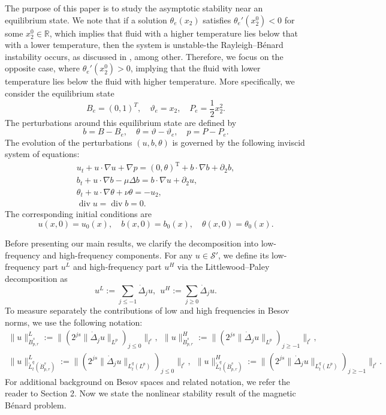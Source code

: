 \documentclass[reqno]{amsart}
\begin{document}
The purpose of this paper is to study the asymptotic stability near an equilibrium state.
We note that if a solution $\theta_e(x_2)$ satisfies $\theta_e'(x_2^0)<0$ for some
$x_2^0\in\mathbb{R}$, which implies that fluid with a higher temperature lies below that with a lower temperature, then the system is unstable-the Rayleigh--B\'enard instability occurs, as discussed
in \cite{MR128226,MR2098531,MR4134456}, among other. Therefore, we focus on the opposite case, where $\theta_e'(x_2^0)>0$, implying that the fluid with lower temperature lies below the fluid with
higher temperature. More specifically, we consider the equilibrium state
$$
{B}_e=(0,1)^T,\quad \vartheta_e=x_2,\quad
 P_e=\frac{1}{2}x_2^2.
 $$
 The perturbations around this equilibrium state are defined by
\begin{equation*}
 b=B-{B}_e,\quad \theta=\vartheta-\vartheta_e,\quad p=P-P_e.
\end{equation*}
The evolution of the perturbations $(u,b,\theta)$ is governed by the following inviscid system of
equations:
\begin{equation}\label{1.2}
\begin{gathered}
 u_t+ u\cdot \nabla u+\nabla p= (0,\theta)^\mathrm{T}+ b\cdot \nabla b+\partial_2b,\\
 b_t+u\cdot\nabla b-\mu\Delta b=b\cdot\nabla u+\partial_2u,\\
 \theta_t+u\cdot \nabla \theta+\nu\theta=-u_2,\\
 \operatorname{div} u=\operatorname{div} b=0.
\end{gathered}
\end{equation}
 The corresponding initial conditions are
 \begin{equation} \label{1.1.2}
 u(x,0)=u_0(x),\quad b(x,0)=b_0(x),\quad \theta(x,0)=\theta_0(x).
 \end{equation}

 Before presenting our main results, we clarify the decomposition into low-frequency and high-frequency
 components. For any $u\in\mathcal{S}'$, we define its low-frequency part $u^{L}$ and high-frequency
 part $u^{H}$ via the Littlewood--Paley decomposition as
\[
 u^L:=\sum_{j\leqslant-1}\dot{\Delta}_ju,\ \ u^H:=\sum_{j\geqslant 0}\dot{\Delta}_ju.
\]
To measure separately the contributions of low and high frequencies in Besov norms, we use the following notation:
\begin{gather*}
\|u\|_{\dot{B}^{s}_{p,r}}^L:=\|(2^{js}\|\dot{\Delta}_ju\|_{L^p})_{j\leqslant 0}\|_{l^r},\ \ \|u\|_{\dot{B}^{s}_{p,r}}^H:=\|(2^{js}\|\dot{\Delta}_ju\|_{L^p})_{j\geqslant -1}\|_{l^r},\\
\|u\|_{\tilde{L}^q_t(\dot{B}^s_{p,r})}^L:=\|(2^{js}\|\dot{\Delta}_ju\|_{L^q_t(L^p)})_{j\leqslant 0}\|_{l^r},\ \ \|u\|_{\tilde{L}^q_t(\dot{B}^s_{p,r})}^H:=\|(2^{js}\|\dot{\Delta}_ju\|_{L^q_t(L^p)})_{j\geqslant -1}\|_{l^r}.
\end{gather*}
For additional background on Besov spaces and related notation, we refer the reader to Section 2.
Now we state the nonlinear stability result of the magnetic B\'enard problem.
\end{document}
